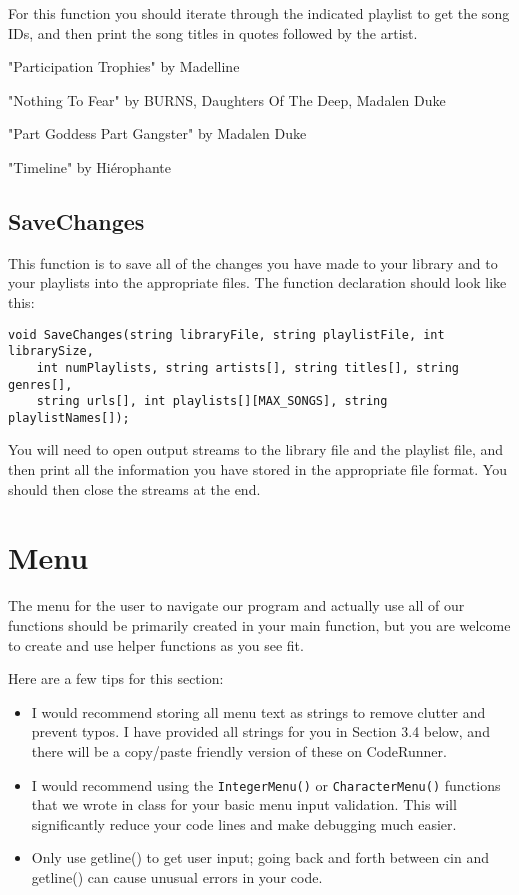 For this function you should iterate through the indicated playlist to get the song IDs, and then print the song titles in quotes followed by the artist. 

\begin{sample}
"Participation Trophies" by Madelline

"Nothing To Fear" by BURNS, Daughters Of The Deep, Madalen Duke

"Part Goddess Part Gangster" by Madalen Duke

"Timeline" by Hiérophante
\end{sample}

\subsection{SaveChanges \star \star}
This function is to save all of the changes you have made to your library and to your playlists into the appropriate files. The function declaration should look like this:

\begin{verbatim}
void SaveChanges(string libraryFile, string playlistFile, int librarySize, 
    int numPlaylists, string artists[], string titles[], string genres[], 
    string urls[], int playlists[][MAX_SONGS], string playlistNames[]);
\end{verbatim}

You will need to open output streams to the library file and the playlist file, and then print all the information you have stored in the appropriate file format. You should then close the streams at the end.

\section{Menu}
The menu for the user to navigate our program and actually use all of our functions should be primarily created in your main function, but you are welcome to create and use helper functions as you see fit. 

Here are a few tips for this section:
\begin{itemize}
    \item I would recommend storing all menu text as strings to remove clutter and prevent typos. I have provided all strings for you in Section 3.4 below, and there will be a copy/paste friendly version of these on CodeRunner. 
    \item I would recommend using the \texttt{IntegerMenu()} or \texttt{CharacterMenu()} functions that we wrote in class for your basic menu input validation. This will significantly reduce your code lines and make debugging much easier.
    \item Only use getline() to get user input; going back and forth between cin and getline() can cause unusual errors in your code.
\end{itemize}

